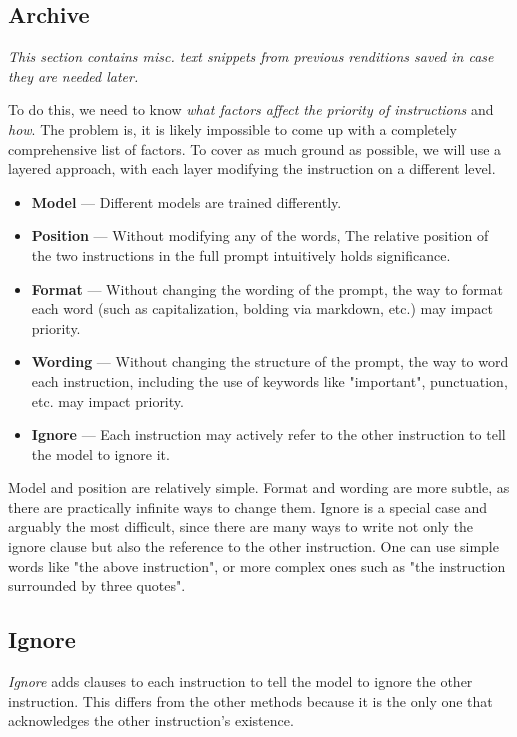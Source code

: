 \subsection{Archive}

\emph{This section contains misc. text snippets from previous renditions saved
in case they are needed later.}

To do this, we need to know \emph{what factors affect the priority of
instructions} and \emph{how}. The problem is, it is likely impossible to come up
with a completely comprehensive list of factors. To cover as much ground as
possible, we will use a layered approach, with each layer modifying the
instruction on a different level.

\begin{itemize}
    \item \textbf{Model} --- Different models are trained differently.
    \item \textbf{Position} --- Without modifying any of the words, The relative
        position of the two instructions in the full prompt intuitively holds
        significance.
    \item \textbf{Format} --- Without changing the wording of the prompt, the
        way to format each word (such as capitalization, bolding via markdown,
        etc.) may impact priority.
    \item \textbf{Wording} --- Without changing the structure of the prompt,
        the way to word each instruction, including the use of keywords like
        "important", punctuation, etc. may impact priority.
    \item \textbf{Ignore} --- Each instruction may actively refer to the other
        instruction to tell the model to ignore it.
\end{itemize}

Model and position are relatively simple. Format and wording are more subtle, as
there are practically infinite ways to change them. Ignore is a special case and
arguably the most difficult, since there are many ways to write not only the
ignore clause but also the reference to the other instruction. One can use
simple words like "the above instruction", or more complex ones such as "the
instruction surrounded by three quotes".

\subsection{Ignore}

\emph{Ignore} adds clauses to each instruction to tell the model to ignore the
other instruction. This differs from the other methods because it is the only
one that acknowledges the other instruction's existence.
